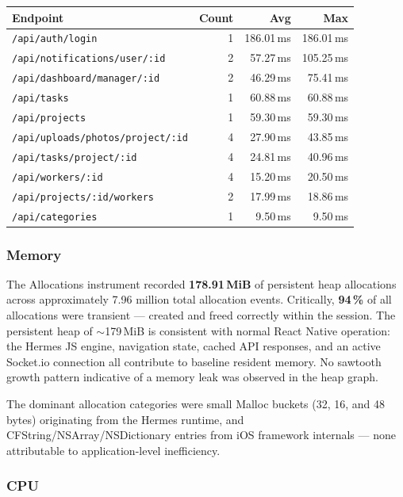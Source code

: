 \documentclass[12pt,a4paper]{article}
\begin{document}
\begin{tabular}{lrrr}
\toprule
\textbf{Endpoint} & \textbf{Count} & \textbf{Avg} & \textbf{Max} \\
\midrule
\texttt{/api/auth/login}                  & 1 & 186.01\,ms & 186.01\,ms \\
\texttt{/api/notifications/user/:id}      & 2 &  57.27\,ms & 105.25\,ms \\
\texttt{/api/dashboard/manager/:id}       & 2 &  46.29\,ms &  75.41\,ms \\
\texttt{/api/tasks}                       & 1 &  60.88\,ms &  60.88\,ms \\
\texttt{/api/projects}                    & 1 &  59.30\,ms &  59.30\,ms \\
\texttt{/api/uploads/photos/project/:id}  & 4 &  27.90\,ms &  43.85\,ms \\
\texttt{/api/tasks/project/:id}           & 4 &  24.81\,ms &  40.96\,ms \\
\texttt{/api/workers/:id}                 & 4 &  15.20\,ms &  20.50\,ms \\
\texttt{/api/projects/:id/workers}        & 2 &  17.99\,ms &  18.86\,ms \\
\texttt{/api/categories}                  & 1 &   9.50\,ms &   9.50\,ms \\
\bottomrule
\end{tabular}

\subsubsection{Memory}

The Allocations instrument recorded \textbf{178.91\,MiB} of persistent heap allocations across approximately 7.96 million total allocation events. Critically, \textbf{94\,\%} of all allocations were transient --- created and freed correctly within the session. The persistent heap of $\sim$179\,MiB is consistent with normal React Native operation: the Hermes JS engine, navigation state, cached API responses, and an active Socket.io connection all contribute to baseline resident memory. No sawtooth growth pattern indicative of a memory leak was observed in the heap graph.

The dominant allocation categories were small Malloc buckets (32, 16, and 48 bytes) originating from the Hermes runtime, and CFString/NSArray/NSDictionary entries from iOS framework internals --- none attributable to application-level inefficiency.

\subsubsection{CPU}
\end{document}
